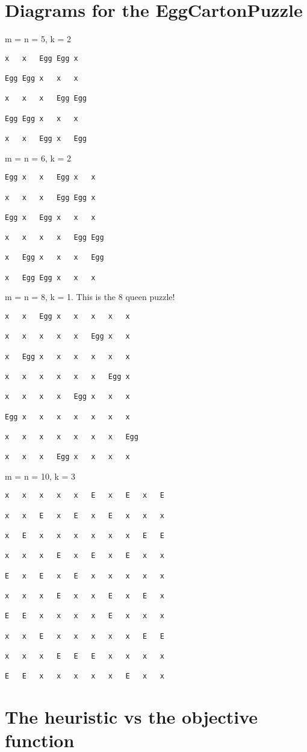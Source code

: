 \documentclass[11pt,a4paper]{article}
\begin{document}
\section{Diagrams for the EggCartonPuzzle}
m = n = 5, k = 2
\begin{lstlisting}
x	x	Egg	Egg	x

Egg	Egg	x	x	x

x	x	x	Egg	Egg

Egg	Egg	x	x	x

x	x	Egg	x	Egg
\end{lstlisting}
m = n = 6, k = 2
\begin{lstlisting}
Egg	x	x	Egg	x	x

x	x	x	Egg	Egg	x

Egg	x	Egg	x	x	x

x	x	x	x	Egg	Egg

x	Egg	x	x	x	Egg

x	Egg	Egg	x	x	x
\end{lstlisting}
m = n = 8, k = 1.
This is the 8 queen puzzle!
\begin{lstlisting}
x	x	Egg	x	x	x	x	x

x	x	x	x	x	Egg	x	x

x	Egg	x	x	x	x	x	x

x	x	x	x	x	x	Egg	x

x	x	x	x	Egg	x	x	x

Egg	x	x	x	x	x	x	x

x	x	x	x	x	x	x	Egg

x	x	x	Egg	x	x	x	x
\end{lstlisting}
\clearpage
m = n = 10, k = 3

\begin{lstlisting}
x   x   x   x   x   E   x   E   x   E

x   x   E   x   E   x   E   x   x   x

x   E   x   x   x   x   x   x   E   E

x   x   x   E   x   E   x   E   x   x

E   x   E   x   E   x   x   x   x   x

x   x   x   E   x   x   E   x   E   x

E   E   x   x   x   x   E   x   x   x

x   x   E   x   x   x   x   x   E   E

x   x   x   E   E   E   x   x   x   x

E   E   x   x   x   x   x   E   x   x
\end{lstlisting}

\section{The heuristic vs the objective function}
\end{document}
